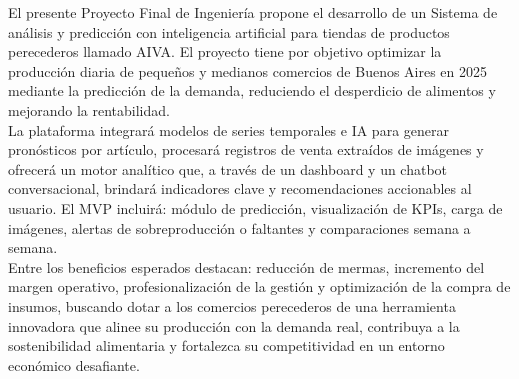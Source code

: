 \begin{Resumen} %

    \indent El presente Proyecto Final de Ingeniería propone el desarrollo de un Sistema de análisis y predicción con inteligencia artificial para tiendas de productos perecederos llamado AIVA. El proyecto tiene por objetivo optimizar la producción diaria de pequeños y medianos comercios de Buenos Aires en 2025 mediante la predicción de la demanda, reduciendo el desperdicio de alimentos y mejorando la rentabilidad.\\

    \indent {}La plataforma integrará modelos de series temporales e IA para generar pronósticos por artículo, procesará registros de venta extraídos de imágenes y ofrecerá un motor analítico que, a través de un dashboard y un chatbot conversacional, brindará indicadores clave y recomendaciones accionables al usuario. El MVP incluirá: módulo de predicción, visualización de KPIs, carga de imágenes, alertas de sobreproducción o faltantes y comparaciones semana a semana.\\

    \indent Entre los beneficios esperados destacan: reducción de mermas, incremento del margen operativo, profesionalización de la gestión y optimización de la compra de insumos, buscando dotar a los comercios perecederos de una herramienta innovadora que alinee su producción con la demanda real, contribuya a la sostenibilidad alimentaria y fortalezca su competitividad en un entorno económico desafiante. 

\end{Resumen}
